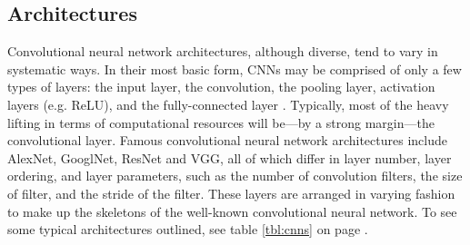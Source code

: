 \subsection{Architectures}
Convolutional neural network architectures, although diverse, tend to vary in systematic ways. In their most basic form, CNNs may be comprised of only a few types of layers: the input layer, the convolution, the pooling layer, activation layers (e.g. ReLU), and the fully-connected layer \cite{convnets}. Typically, most of the heavy lifting in terms of computational resources will be---by a strong margin---the convolutional layer. Famous convolutional neural network architectures include AlexNet, GooglNet, ResNet and VGG, all of which differ in layer number, layer ordering, and layer parameters, such as the number of convolution filters, the size of filter, and the stride of the filter. These layers are arranged in varying fashion to make up the skeletons of the well-known convolutional neural network. To see some typical architectures outlined, see table \ref{tbl:cnns} on page \pageref{tbl:cnns}.


